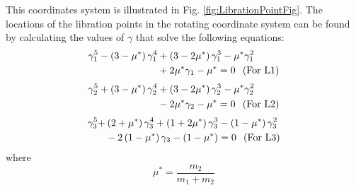 This coordinates system is illustrated in Fig.
\ref{fig:LibrationPointFig}.  The locations of the libration points
in the rotating coordinate system can be found by calculating the
values of $\gamma$ that solve the following equations:
%
\begin{eqnarray}
\begin{split}
\gamma _1^5  - \left( {3 - \mu^*} \right)\gamma _1^4 & + \left( {3 -
2\mu^*} \right)\gamma _1^3  - \mu^*\gamma _1^2  \\ &+ 2\mu^*\gamma
_1 - \mu^*  = 0 \hspace{.1 in} \mbox{(For L1)} \label{Eq:L1quintic}
\end{split}
\end{eqnarray}
%
\begin{eqnarray}
\begin{split}
 \gamma _2^5  + \left( {3 - \mu^*}
\right)\gamma _2^4  & +  \left( {3 - 2\mu^*} \right)\gamma _2^3  -
\mu^*\gamma _2^2  \\ &- 2\mu^*\gamma _2  - \mu^*  = 0  \hspace{.1
in} \mbox{(For L2)} \label{Eq:L2quintic}
\end{split}
\end{eqnarray}
%
\begin{eqnarray}
\begin{split}
 \gamma _3^5  + & \left( {2 + \mu^*} \right)\gamma _3^4   + \left(
{1 + 2\mu^*} \right)\gamma _3^3  - \left( {1 - \mu^*} \right)\gamma
_3^2  \\ & - 2\left( {1 - \mu^*} \right)\gamma _3  - \left( {1 -
\mu^*} \right)  =  0 \hspace{.1 in} \mbox{(For L3)}
\label{Eq:L3quintic}
\end{split}
\end{eqnarray}
where
%
\begin{equation}
\mu^* = \frac{{m_2 }} {{m_1 +  m_2 }}
\end{equation}
%

